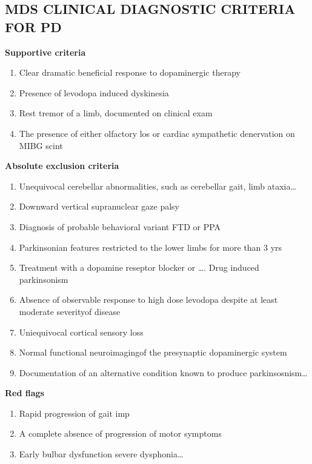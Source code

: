 \documentclass[pdf,  style=code128, globalid=OMRCRFv5.0.3, english, stamp, pagemark, oneside]{sdapsclassic}
\begin{document}
\begin{questionnaire}
    \section{MDS CLINICAL DIAGNOSTIC CRITERIA FOR PD}
           \begin{tcolorbox}
            \textbf{Supportive criteria}
            \begin{enumerate}
              \item Clear dramatic beneficial response to dopaminergic therapy
              \item Presence of levodopa induced dyskinesia
              \item Rest tremor of a limb, documented on clinical exam
              \item The presence of either olfactory los or cardiac sympathetic denervation on MIBG scint
            \end{enumerate}
            \textbf{Absolute exclusion criteria}
            \begin{enumerate}
              \item Unequivocal cerebellar abnormalities, such as cerebellar gait, limb ataxia…
              \item Downward vertical supranuclear gaze palsy
              \item Diagnosis of probable behavioral variant FTD or PPA
              \item Parkinsonian features restricted to the lower limbs for more than 3 yrs
              \item Treatment with a dopamine reseptor blocker or …. Drug induced parkinsonism
              \item Absence of observable response to high dose levodopa despite at least moderate severityof disease
              \item Uniequivocal cortical sensory loss
              \item Normal functional neuroimagingof the presynaptic dopaminergic system
              \item Documentation of an alternative condition known to produce parkinsosnism…
            \end{enumerate}
            \textbf{Red flags}
            \begin{enumerate}
              \item Rapid progression of gait imp
              \item A complete absence of progression of motor symptoms
              \item Early bulbar dysfunction severe dysphonia…

\end{enumerate}
\end{tcolorbox}
\end{questionnaire}
\end{document}
